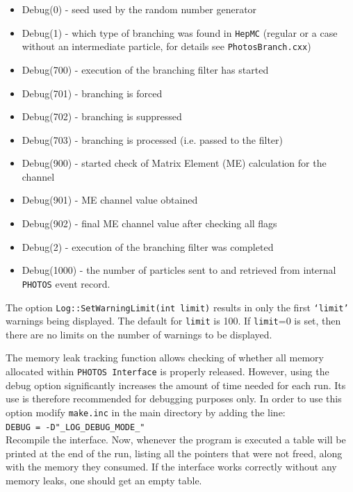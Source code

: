 \documentclass[]{Photos_interface_design}
\begin{document}
\begin{itemize}
  \item Debug(0)    - seed used by the random number generator
  \item Debug(1)    - which type of branching was found in {\tt HepMC}
                     (regular or a case without an intermediate particle, for details see {\tt PhotosBranch.cxx})
  \item Debug(700)  - execution of the branching filter has started
  \item Debug(701)  - branching is forced
  \item Debug(702)  - branching is suppressed
  \item Debug(703)  - branching is processed (i.e. passed to the filter)
  \item Debug(900)  - started check of Matrix Element (ME) calculation for the  channel %
  \item Debug(901)  - ME channel value obtained
  \item Debug(902)  - final ME channel value after checking all flags
  \item Debug(2)    - execution of the branching filter was completed
  \item Debug(1000) - the number of particles sent to and retrieved from internal {\tt PHOTOS} event record.
\end{itemize}
 
The option {\tt Log::SetWarningLimit(int limit)} results in 
only the first {\tt `limit'} warnings being displayed. The default for {\tt limit} is 100. 
If {\tt limit}=0 is set, then there are no limits on the number of warnings to be displayed.

The memory leak tracking function allows checking of whether all memory allocated within {\tt PHOTOS Interface}
 is properly released. However, using the debug option significantly increases the amount of time needed for 
each run. Its  use is therefore recommended  for debugging purposes only. In order to use this option
 modify {\tt make.inc} in the main directory by adding the line: \\ 
 {\tt DEBUG = -D"\_LOG\_DEBUG\_MODE\_" } \\ 
Recompile the interface.
Now, whenever the program is executed a table will be printed at the end of the run,
listing all the pointers that were not freed, along with the memory they consumed.
If the interface works correctly without any memory leaks, one should get an empty table.
\end{document}
